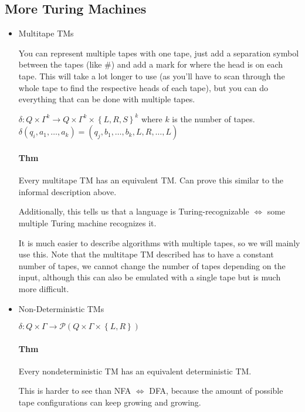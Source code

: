 \documentclass[12 pt]{article}
\begin{document}
\subsection{More Turing Machines}
\begin{itemize}
\item Multitape TMs

  You can represent multiple tapes with one tape, just add a
  separation symbol between the tapes (like $\#$) and add a mark for
  where the head is on each tape. This will take a lot longer to use
  (as you'll have to scan through the whole tape to find the
  respective heads of each tape), but you can do everything that can
  be done with multiple tapes.

  $\delta: Q \times \Gamma^k \to Q \times \Gamma^k \times
  \left\{L,R,S\right\}^k$ where $k$ is the number of
  tapes. $\delta(q_i, a_1, \ldots, a_k) = (q_j, b_1, \ldots, b_k, L,
  R, \ldots, L)$
  \paragraph{Thm} Every multitape TM has an equivalent TM. Can
  prove this similar to the informal description above.

  Additionally, this tells us that a language is Turing-recognizable
  $\iff$ some multiple Turing machine recognizes it.

  It is much easier to describe algorithms with multiple tapes, so we
  will mainly use this. Note that the multitape TM described has to have a
  constant number of tapes, we cannot change the number of tapes
  depending on the input, although this can also be emulated with a
  single tape but is much more difficult.
\item Non-Deterministic TMs

  $\delta: Q \times \Gamma \to \mathcal{P}(Q \times \Gamma \times
  \left\{L,R\right\})$

  \paragraph{Thm}Every nondeterministic TM has an equivalent
  deterministic TM.

  This is harder to see than NFA $\iff$ DFA, because the amount of
  possible tape configurations can keep growing and growing.


\end{itemize}
\end{document}
